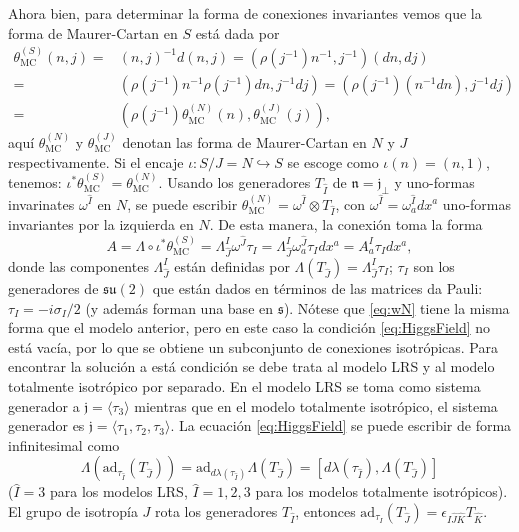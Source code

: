 Ahora bien, para determinar la forma de conexiones invariantes vemos que la forma de Maurer-Cartan en $S$ est\'{a} dada por
%
\begin{align*}
\label{eq:MC-S}
\theta^{(S)}_{\mathrm{MC}} (n, j) = & (n, j)^{-1} d(n, j) = (\rho(j^{-1}) n^{-1}, j^{-1}) (dn, dj) \\
= & (\rho(j^{-1}) n^{-1} \rho(j^{-1}) dn, j^{-1} dj) = (\rho(j^{-1}) (n^{-1} dn), j^{-1} dj) \\
= & \left(\rho(j^{-1}) \theta^{(N)}_{\mathrm{MC}} (n), \theta^{(J)}_{\mathrm{MC}} (j) \right),
\end{align*}
%
aqu\'{i} $\theta^{(N)}_{\mathrm{MC}}$ y $\theta^{(J)}_{\mathrm{MC}}$ denotan las forma de Maurer-Cartan en $N$ y $J$ respectivamente. Si el encaje $\iota: S/J = N \hookrightarrow S$ se escoge como $\iota(n) = (n, 1)$, tenemos: $\iota^{*} \theta^{(S)}_{\mathrm{MC}} = \theta^{(N)}_{\mathrm{MC}}$. Usando los generadores $T_{\hat{I}}$ de $\mathfrak{n} = \mathfrak{j}_{\perp}$ y uno-formas invarinates $\omega^{\hat{I}}$ en $N$, se puede escribir $\theta^{(N)}_{\mathrm{MC}} = \omega^{\hat{I}} \otimes T_{\hat{I}}$, con $\omega^{\hat{I}} = \omega^{\hat{I}}_{a} dx^{a}$ uno-formas invariantes por la izquierda en $N$. De esta manera, la conexi\'{o}n toma la forma
%
\begin{equation}
\label{eq:wN}
A = \Lambda \circ \iota^{*} \theta^{(S)}_{\mathrm{MC}} = \Lambda^{I}_{\hat{J}} \omega^{\hat{J}} \tau_{I} =  \Lambda^{I}_{\hat{J}} \omega^{\hat{J}}_{a} \tau_{I} dx^{a} = A^{I}_{a} \tau_{I} dx^{a},
\end{equation}
%
donde las componentes $\Lambda^{I}_{\hat{J}}$ est\'{a}n definidas por $\Lambda(T_{\hat{J}}) = \Lambda^{I}_{\hat{J}} \tau_{I}$; $\tau_{I}$ son los generadores de $\mathfrak{su} (2)$ que est\'{a}n dados en t\'{e}rminos de las matrices da Pauli: $\tau_{I} = -i \sigma_{I}/2$ (y adem\'{a}s forman una base en $\mathfrak{s}$). N\'{o}tese que \eqref{eq:wN} tiene la misma forma que el modelo anterior, pero en este caso la condici\'{o}n \eqref{eq:HiggsField} no est\'{a} vac\'{i}a, por lo que se obtiene un subconjunto de conexiones isotr\'{o}picas. Para encontrar la soluci\'{o}n a est\'{a} condici\'{o}n se debe trata al modelo LRS y al modelo totalmente isotr\'{o}pico por separado. En el modelo LRS se toma como sistema generador a $\mathfrak{j} = \langle \tau_{3} \rangle$ mientras que en el modelo totalmente isotr\'{o}pico, el sistema generador es $\mathfrak{j} = \langle \tau_{1}, \tau_{2}, \tau_{3} \rangle$. La ecuaci\'{o}n \eqref{eq:HiggsField} se puede escribir de forma infinitesimal como
%
\begin{equation*}
\Lambda (\mathrm{ad}_{\tau_{\hat{I}}} (T_{\hat{J}})) = \mathrm{ad}_{d \lambda (\tau_{\hat{I}})} \Lambda (T_{\hat{J}}) = [d \lambda (\tau_{\hat{I}}), \Lambda (T_{\hat{J}})]
\end{equation*}
%
($\hat{I} = 3$ para los modelos LRS, $\hat{I} = 1,2,3$ para los modelos totalmente isotr\'{o}picos). El grupo de isotrop\'{i}a $J$ rota los generadores $T_{\hat{I}}$, entonces $\mathrm{ad}_{\tau_{I}} (T_{\hat{J}}) = \epsilon_{I \hat{J} \hat{K}} T_{\hat{K}}$.

